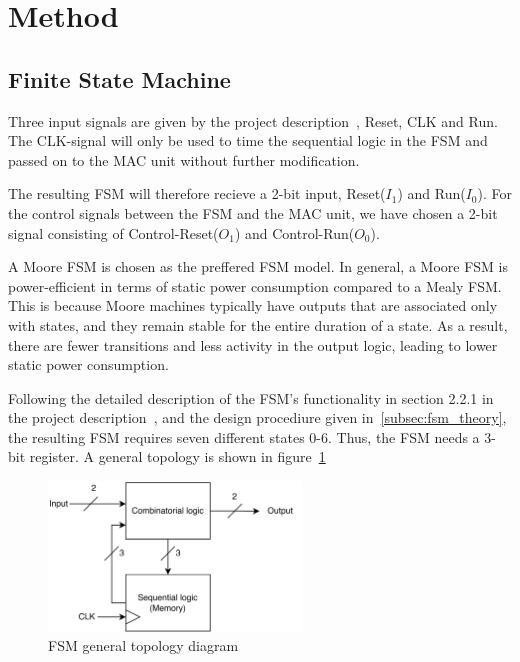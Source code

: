 \section{Method}
\label{sec:method}

\subsection{Finite State Machine}
\label{subsec:fsm_}

Three input signals are given by the project description~\cite{project_description}, Reset, CLK and Run. The CLK-signal will only be used to time the sequential logic in the FSM and passed on to the MAC unit without further modification.

The resulting FSM will therefore recieve a 2-bit input, Reset($I_1$) and Run($I_0$). For the control signals between the FSM and the MAC unit, we have chosen a 2-bit signal consisting of Control-Reset($O_1$) and Control-Run($O_0$). 

A Moore FSM is chosen as the preffered FSM model. In general, a Moore FSM is power-efficient in terms of static power consumption compared to a Mealy FSM. This is because Moore machines typically have outputs that are associated only with states, and they remain stable for the entire duration of a state. As a result, there are fewer transitions and less activity in the output logic, leading to lower static power consumption.

Following the detailed description of the FSM's functionality in section 2.2.1 in the project description~\cite{project_description}, and the design procediure given in~\ref{subsec:fsm_theory}, the resulting FSM requires seven different states 0-6. Thus, the FSM needs a 3-bit register. A general topology is shown in figure~\ref{fig:fsm_overordnet}

\begin{figure}[H]
    \centering
    \includegraphics[width=0.6\textwidth]{Figures/FSM_overordnet.drawio.png}
    \caption{FSM general topology diagram}
    \label{fig:fsm_overordnet}
\end{figure}

